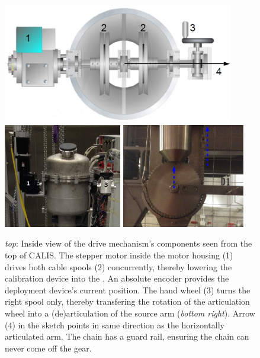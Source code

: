 \begin{figure}[htbp]
 \centering
\includegraphics[width=0.9\textwidth]{Figures/gearDrawing_withNumbers}
  \includegraphics[width=0.46\textwidth]{Figures/CALIS_head.png}
  \includegraphics[width=0.48\textwidth]{Figures/gearArticulated.png}
  \caption{\textit{top}: Inside view of the drive mechanism's components seen from the top of CALIS. The stepper motor inside the motor housing (1) drives both cable spools (2) concurrently, thereby lowering the calibration device into the \lsv. An absolute encoder provides the deployment device's current position. The hand wheel (3) turns the right spool only, thereby transfering the rotation of the articulation wheel into a (de)articulation of the source arm (\textit{bottom right}). Arrow (4) in the sketch points in same direction as the horizontally articulated arm. The chain has a guard rail, ensuring the chain can never come off the gear.}
  \label{fig:sourceArmRotation}
\end{figure} 

